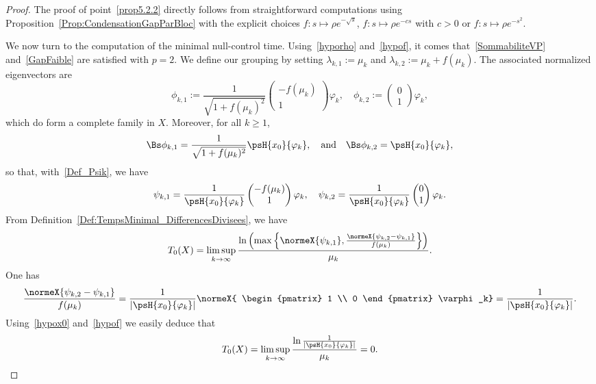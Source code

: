 \begin{proof}
The proof of point~\eqref{prop5.2.2} directly follows from straightforward computations using Proposition~\ref{Prop:CondensationGapParBloc} with the explicit choices $f : s \mapsto \rho e^{-\sqrt{s}}$, $ f : s \mapsto \rho e^{-cs}$ with $c >0$ or $f : s \mapsto \rho e^{-s^2}$.

We now turn to the computation of the minimal null-control time. Using~\eqref{hyporho} and~\eqref{hypof}, it comes that~\eqref{SommabiliteVP} and~\eqref{GapFaible} are satisfied with $p=2$. We define our grouping by setting $\lambda_{k,1}:=\mu_k$ and $\lambda_{k,2}:=\mu_k+f(\mu_k)$. The associated normalized eigenvectors are
\[
\phi_{k,1} := \frac{1}{\sqrt{1+f(\mu_k)^2}}
\begin{pmatrix} -f(\mu_k) \\ 1
\end{pmatrix} \varphi_k,
\quad
\phi_{k,2} :=
\begin{pmatrix} 0 \\ 1
\end{pmatrix} \varphi_k,
\]
which do form a complete family in $X$. Moreover, for all $k \geq 1$,
\[
\Bs \phi_{k,1}= \frac{1}{\sqrt{1+f(\mu_k)^2}} \psH{x_0}{\varphi_k},
\quad \text{and} \quad
\Bs \phi_{k,2}= \psH{x_0}{\varphi_k},
\]
so that, with~\eqref{Def_Psik}, we have
\[
\psi_{k,1} = \frac{1}{\psH{x_0}{\varphi_k}}
\begin{pmatrix} -f(\mu_k) \\ 1
\end{pmatrix} \varphi_k,
\quad
\psi_{k,2} = \frac{1}{\psH{x_0}{\varphi_k}}
\begin{pmatrix} 0 \\ 1
\end{pmatrix} \varphi_k.
\]
From Definition~\eqref{Def:TempsMinimal_DifferencesDivisees}, we have
\[
T_0(X) = \limsup_{k \to \infty}\frac{\ln \left(\max \left\{ \normeX{\psi_{k,1}}, \frac{ \normeX{\psi_{k,2}-\psi_{k,1}} }{f(\mu_k)} \right\}\right) }{\mu_k}.
\]
One has
\begin{equation}\label{ExemplesCompensation}
\frac{ \normeX{\psi_{k,2}-\psi_{k,1}} }{f(\mu_k)} = \frac{1}{| \psH{x_0}{\varphi_k} |} \normeX{
\begin{pmatrix} 1 \\ 0
\end{pmatrix} \varphi_k} = \frac{1}{| \psH{x_0}{\varphi_k} |}.
\end{equation}
Using~\eqref{hypox0} and~\eqref{hypof} we easily deduce that
\[
T_0(X) = \limsup_{k \to \infty}\frac{\ln \frac{1}{| \psH{x_0}{\varphi_k} |}}{\mu_k} = 0.\qedhere
\]
\end{proof}

